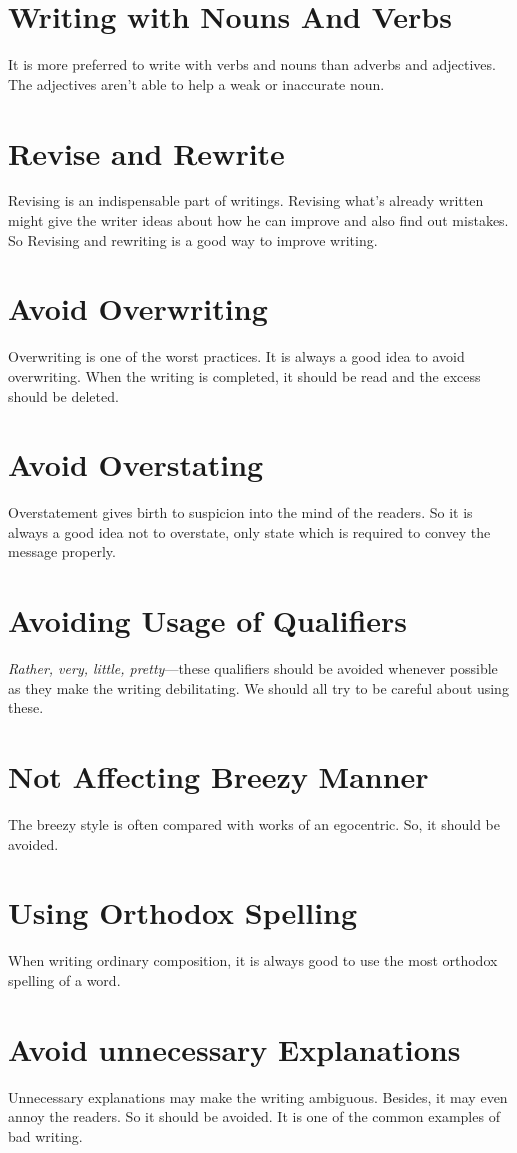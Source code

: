 \documentclass{report}
\begin{document}
\section{Writing with Nouns And Verbs}
It is more preferred to write with verbs and nouns than adverbs and adjectives. The adjectives aren't able to help a weak or inaccurate noun.
\section{Revise and Rewrite}
Revising is an indispensable part of writings. Revising what's already written might give the writer ideas about how he can improve and also find out mistakes. So Revising and rewriting is a good way to improve writing.
\section{Avoid Overwriting}
Overwriting is one of the worst practices. It is always a good idea to avoid overwriting. When the writing is completed, it should be read and the excess should be deleted.
\section{Avoid Overstating}
Overstatement gives birth to suspicion into the mind of the readers. So it is always a good idea not to overstate, only state which is required to convey the message properly.
\section{Avoiding Usage of Qualifiers}
\textit{Rather, very, little, pretty}---these qualifiers should be avoided whenever possible as they make the writing debilitating. We should all try to be careful about using these.
\section{Not Affecting Breezy Manner}
The breezy style is often compared with works of an egocentric. So, it should be avoided.
\section{Using Orthodox Spelling}
When writing ordinary composition, it is always good to use the most orthodox spelling of a word.
\section{Avoid unnecessary Explanations}
Unnecessary explanations may make the writing ambiguous. Besides, it may even annoy the readers. So it should be avoided. It is one of the common examples of bad writing.
\end{document}

